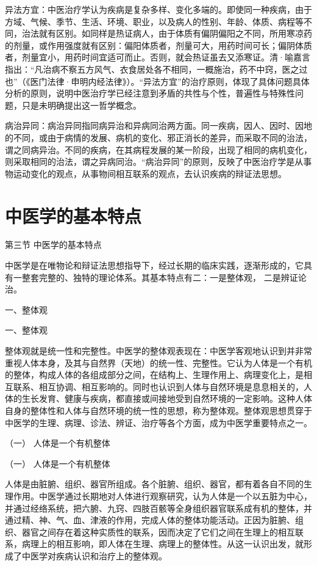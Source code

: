 \documentclass[a4paper,12pt,UTF8,twoside]{ctexbook}
\begin{document}
异法方宜：中医治疗学认为疾病是复杂多样、变化多端的。即使同一种疾病，由于方域、气候、季节、生活、环境、职业，以及病人的性别、年龄、体质、病程等不同，治法就有区别。如同样是热证病人，由于体质有偏阴偏阳之不同，所用寒凉药的剂量，或作用强度就有区别：偏阳体质者，剂量可大，用药时间可长；偏阴体质者，剂量宜小，用药时间宜适可而止。否则，就会热证虽去又添寒证。清·喻嘉言指出：“凡治病不察五方风气、衣食居处各不相同，一概施治，药不中窍，医之过也”（《医门法律·申明内经法律》）。“异法方宜”的治疗原则，体现了具体问题具体分析的原则，说明中医治疗学已经注意到矛盾的共性与个性，普遍性与特殊性问题，只是未明确提出这一哲学概念。

病治异同：病治异同指同病异治和异病同治两方面。同一疾病，因人、因时、因地的不同，或由于病情的发展、病机的变化、邪正消长的差异，而采取不同的治法，谓之同病异治。不同的疾病，在其病程发展的某一阶段，出现了相同的病机变化，则采取相同的治法，谓之异病同治。“病治异同”的原则，反映了中医治疗学是从事物运动变化的观点，从事物间相互联系的观点，去认识疾病的辩证法思想。

\section{中医学的基本特点}

第三节 中医学的基本特点

中医学是在唯物论和辩证法思想指导下，经过长期的临床实践，逐渐形成的，它具有一整套完整的、独特的理论体系。其基本特点有二：一是整体观， 二是辨证论治。

一、整体观

一、整体观

整体观就是统一性和完整性。中医学的整体观表现在：中医学客观地认识到并非常重视人体本身，及其与自然界（天地）的统一性、完整性。它认为人体是一个有机的整体，构成人体的各组成部分之间，在结构上、生理作用上、病理变化上，是相互联系、相互协调、相互影响的。同时也认识到人体与自然环境是息息相关的，人体的生长发育、健康与疾病，都直接或间接地受到自然环境的一定影响。这种人体自身的整体性和人体与自然环境的统一性的思想，称为整体观。整体观思想贯穿于中医学的生理、病理、诊法、辨证、治疗等各个方面，成为中医学重要特点之一。

（一） 人体是一个有机整体

（一） 人体是一个有机整体

人体是由脏腑、组织、器官所组成。各个脏腑、组织、器官，都有着各自不同的生理作用。中医学通过长期地对人体进行观察研究，认为人体是一个以五脏为中心，并通过经络系统，把六腑、九窍、四肢百骸等全身组织器官联系成有机的整体，并通过精、神、气、血、津液的作用，完成人体的整体功能活动。正因为脏腑、组织、器官之间存在着这种实质性的联系，因而决定了它们之间在生理上的相互联系，病理上的相互影响，即人体在生理、病理上的整体性。从这一认识出发，就形成了中医学对疾病认识和治疗上的整体观。
\end{document}
